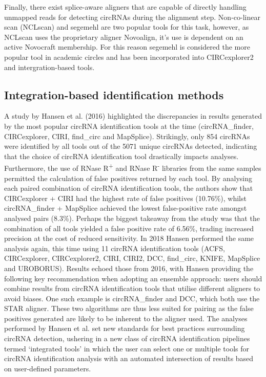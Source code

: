 \documentclass[journal,review,submit,pdftex,moreauthors]{Definitions/mdpi}
\begin{document}
Finally, there exist splice-aware aligners that are capable of directly handling unmapped reads for detecting circRNAs during the alignment step. Non-co-linear scan (NCLscan) \cite{NCLscan} and segemehl \cite{segemehl} are two popular tools for this task, however, as NCLscan uses the proprietary aligner Novoalign, it's use is dependent on an active Novocraft membership. For this reason segemehl is considered the more popular tool in academic circles and has been incorporated into CIRCexplorer2 and intergration-based tools. 

\subsection{Integration-based identification methods}
A study by Hansen et al. (2016) \cite{Hansen2016Apr} highlighted the discrepancies in results generated by the most popular circRNA identification tools at the time (circRNA\_finder, CIRCexplorer, CIRI, find\_circ and MapSplice). Strikingly, only 854 circRNAs were identified by all tools out of the 5071 unique circRNAs detected, indicating that the choice of circRNA identification tool drastically impacts analyses. Furthermore, the use of RNase R\textsuperscript{+} and RNase R\textsuperscript{-} libraries from the same samples permitted the calculation of false positives returned by each tool. By analysing each paired combination of circRNA identification tools, the authors show that CIRCexplorer + CIRI had the highest rate of false positives (10.76\%), whilst circRNA\_finder + MapSplice achieved the lowest false-positive rate amongst analysed pairs (8.3\%). Perhaps the biggest takeaway from the study was that the combination of all tools yielded a false positive rate of 6.56\%, trading increased precision at the cost of reduced sensitivity. In 2018 Hansen \cite{Hansen2018} performed the same analysis again, this time using 11 circRNA identification tools (ACFS, CIRCexplorer, CIRCexplorer2, CIRI, CIRI2, DCC, find\_circ, KNIFE, MapSplice and UROBORUS). Results echoed those from 2016, with Hansen providing the following key recommendation when adopting an ensemble approach: users should combine results from circRNA identification tools that utilise different aligners to avoid biases. One such example is circRNA\_finder and DCC, which both use the STAR aligner. These two algorithms are thus less suited for pairing as the false positives generated are likely to be inherent to the aligner used. The analyses performed by Hansen et al. set new standards for best practices surrounding circRNA detection, ushering in a new class of circRNA identification pipelines termed `integrated tools' in which the user can select one or multiple tools for circRNA identification analysis with an automated intersection of results based on user-defined parameters. \par
\end{document}
